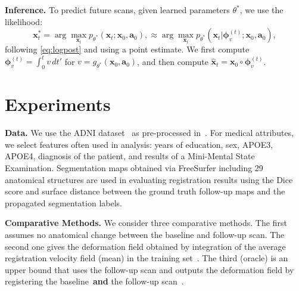 \documentclass{midl} %
\newcommand{\bx}{\boldsymbol{x}}
\newcommand{\ba}{\boldsymbol{a}}
\newcommand{\bphi}{\boldsymbol{\phi}}
\begin{document}
\vspace{0.2cm}\noindent\textbf{Inference.} To predict future scans, given learned parameters $\theta^\ast$, we use the likelihood:
\begin{equation}
    \bx^\ast_t = \arg \max_{ \bx_t} p_{\theta^\ast} (\bx_t; \bx_0, \ba_0),\nonumber \approx \arg \max_{ \bx_t} p_{\theta^\ast} (\bx_t| \bphi_v^{(t)}; \bx_0, \ba_0),
\end{equation}
%
following \eqref{eq:logpost} and using a point estimate. We first compute $\bphi_v^{(t)} = \int_0^t v\, dt'$ for $v = g_{\theta^\ast}  (\bx_0, \ba_0)$, and then compute $\hat{\bx}_t = \bx_0 \circ \bphi_v^{(t)}$.



\vspace{-0.3cm}
\section{Experiments}
\vspace{-0.15cm}
\noindent\textbf{Data.}  We use the ADNI dataset~\cite{mueller2005ways} as pre-processed in~\cite{dalca2018anatomical}. For medical attributes, we select features often used in analysis: years of education, sex, APOE3, APOE4, diagnosis of the patient, and results of a Mini-Mental State Examination. Segmentation maps obtained via FreeSurfer including 29 anatomical structures are used in evaluating registration results using the Dice score and surface distance between the ground truth follow-up maps and the propagated segmentation labels.%


\vspace{0.2cm}\noindent\textbf{Comparative Methods.} We consider three comparative methods. The first assumes no anatomical change between the baseline and follow-up scan. The second one gives the deformation field obtained by integration of the average registration velocity field (mean) in the training set~\cite{ashburner2007fast}. The third (oracle) is an upper bound that uses the follow-up scan and outputs the deformation field by registering the baseline~\textbf{and} the follow-up scan~\cite{balakrishnan2018unsupervised}. 

\end{document}
